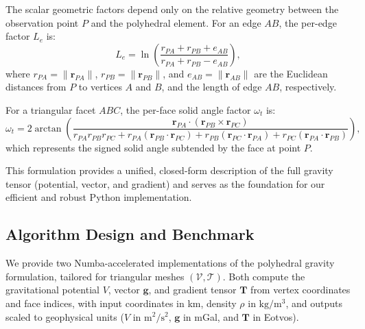 \documentclass{seg}
\begin{document}
The scalar geometric factors depend only on the relative geometry between the observation point $P$ and the polyhedral element. For an edge $AB$, the per-edge factor $L_e$ is:
\begin{equation}
L_e = \ln \left( \frac{r_{PA} + r_{PB} + e_{AB}}{r_{PA} + r_{PB} - e_{AB}} \right), \tag{6}
\end{equation}
where $r_{PA} = \|\mathbf{r}_{PA}\|$, $r_{PB} = \|\mathbf{r}_{PB}\|$, and $e_{AB} = \|\mathbf{r}_{AB}\|$ are the Euclidean distances from $P$ to vertices $A$ and $B$, and the length of edge $AB$, respectively.

For a triangular facet $ABC$, the per-face solid angle factor $\omega_t$ is:
\begin{equation}
\omega_t = 2 \arctan \left( 
\frac{
\mathbf{r}_{PA} \cdot (\mathbf{r}_{PB} \times \mathbf{r}_{PC})
}{
r_{PA} r_{PB} r_{PC} 
+ r_{PA} (\mathbf{r}_{PB} \cdot \mathbf{r}_{PC}) 
+ r_{PB} (\mathbf{r}_{PC} \cdot \mathbf{r}_{PA}) 
+ r_{PC} (\mathbf{r}_{PA} \cdot \mathbf{r}_{PB})
} \right), \tag{7}
\end{equation}
which represents the signed solid angle subtended by the face at point $P$.

This formulation provides a unified, closed-form description of the full gravity tensor (potential, vector, and gradient) and serves as the foundation for our efficient and robust Python implementation.

\subsection*{Algorithm Design and Benchmark}

We provide two Numba-accelerated implementations of the \citet{Werner1996CelestialMechDynAstr} polyhedral gravity formulation, tailored for triangular meshes $(\mathcal{V}, \mathcal{T})$. Both compute the gravitational potential $V$, vector $\mathbf{g}$, and gradient tensor $\mathbf{T}$ from vertex coordinates and face indices, with input coordinates in km, density $\rho$ in $\mathrm{kg/m^3}$, and outputs scaled to geophysical units ($V$ in $\mathrm{m^2/s^2}$, $\mathbf{g}$ in mGal, and $\mathbf{T}$ in Eotvos).
\end{document}
